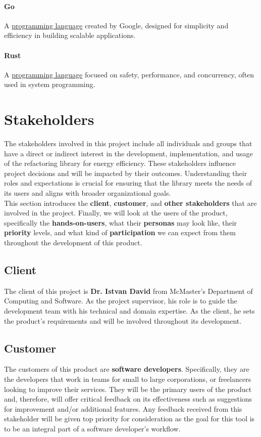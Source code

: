 \documentclass[12pt]{article}
\begin{document}
\paragraph*{Go}
A \hyperref[term:progl]{programming language} created by Google, designed for simplicity and efficiency in building scalable applications.

\paragraph*{Rust}
A \hyperref[term:progl]{programming language} focused on safety, performance, and concurrency, often used in system programming.


\section{Stakeholders}

The stakeholders involved in this project include all individuals and groups that have a direct or indirect interest in the development, implementation, and usage of the refactoring library for energy efficiency. These stakeholders influence project decisions and will be impacted by their outcomes. Understanding their roles and expectations is crucial for ensuring that the library meets the needs of its users and aligns with broader organizational goals.\\

This section introduces the \textbf{client}, \textbf{customer}, and \textbf{other stakeholders} that are involved in the project. Finally, we will look at the users of the product, specifically the \textbf{hands-on-users}, what their \textbf{personas} may look like, their \textbf{priority} levels, and what kind of \textbf{participation} we can expect from them throughout the development of this product.
\subsection{Client}
The client of this project is \textbf{Dr. Istvan David} from McMaster's Department of Computing and Software. As the project supervisor, his role is to guide the development team with his technical and domain expertise. As the client, he sets the product's requirements and will be involved throughout its development. 
\subsection{Customer}
The customers of this product are \textbf{software developers}. Specifically, they are the developers that work in teams for small to large corporations, or freelancers looking to improve their services. They will be the primary users of the product and, therefore, will offer critical feedback on its effectiveness such as suggestions for improvement and/or additional features. Any feedback received from this stakeholder will be given top priority for consideration as the goal for this tool is to be an integral part of a software developer's workflow. 
\end{document}
